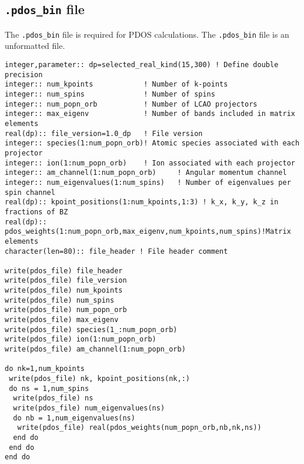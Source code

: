 \documentclass[a4paper,11pt,twoside]{book}
\begin{document}
{\begin{appendix}
\section{\texttt{.pdos\_bin} file}
The \texttt{.pdos\_bin} file is required for PDOS calculations.
%
The \texttt{.pdos\_bin} file is an unformatted file.
\begin{verbatim}
integer,parameter:: dp=selected_real_kind(15,300) ! Define double precision
integer:: num_kpoints            ! Number of k-points
integer:: num_spins              ! Number of spins
integer:: num_popn_orb           ! Number of LCAO projectors
integer:: max_eigenv             ! Number of bands included in matrix elements
real(dp):: file_version=1.0_dp   ! File version
integer:: species(1:num_popn_orb)! Atomic species associated with each projector
integer:: ion(1:num_popn_orb)    ! Ion associated with each projector
integer:: am_channel(1:num_popn_orb)     ! Angular momentum channel
integer:: num_eigenvalues(1:num_spins)   ! Number of eigenvalues per spin channel
real(dp):: kpoint_positions(1:num_kpoints,1:3) ! k_x, k_y, k_z in fractions of BZ
real(dp):: pdos_weights(1:num_popn_orb,max_eigenv,num_kpoints,num_spins)!Matrix elements
character(len=80):: file_header ! File header comment

write(pdos_file) file_header
write(pdos_file) file_version
write(pdos_file) num_kpoints
write(pdos_file) num_spins
write(pdos_file) num_popn_orb
write(pdos_file) max_eigenv
write(pdos_file) species(1_:num_popn_orb)
write(pdos_file) ion(1:num_popn_orb)
write(pdos_file) am_channel(1:num_popn_orb)

do nk=1,num_kpoints
 write(pdos_file) nk, kpoint_positions(nk,:)
 do ns = 1,num_spins
  write(pdos_file) ns
  write(pdos_file) num_eigenvalues(ns)
  do nb = 1,num_eigenvalues(ns)
   write(pdos_file) real(pdos_weights(num_popn_orb,nb,nk,ns))
  end do
 end do
end do
\end{verbatim}


\begin{landscape}

\end{landscape}
\end{appendix}}
\end{document}
